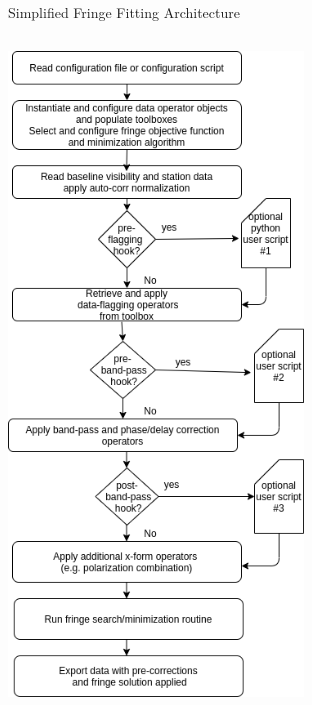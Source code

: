 \documentclass[8pt]{beamer}
\begin{document}
\begin{frame}{Simplified Fringe Fitting Architecture}
\centering


\begin{columns}[T]
  \centering
    \begin{column}{.5\textwidth}
    \centering
    \begin{minipage}{5cm}
    \includegraphics[width=0.7\textwidth]{./example-single-baseline-fringe-fitter.png}
    \end{minipage}
    \end{column}
  \begin{column}{.6\textwidth}
  \centering
  \hspace{-3cm}
  \begin{minipage}{8cm}
\vspace{1cm}

\end{minipage}
\end{column}
\end{columns}
\end{frame}
\end{document}
